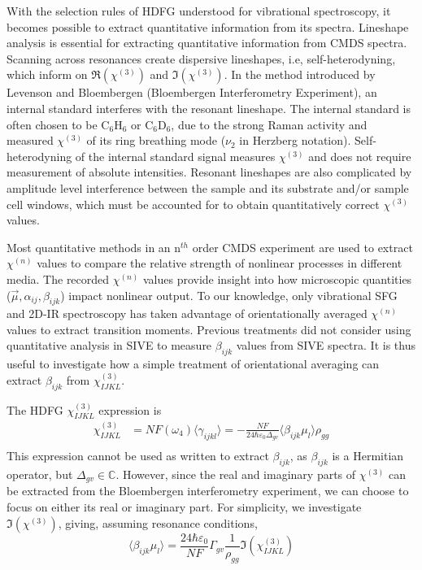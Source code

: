 \documentclass[aip, jcp, reprint, onecolumn]{revtex4-2}
\begin{document}
With the selection rules of HDFG understood for vibrational spectroscopy, it becomes possible to extract quantitative information from its spectra.
Lineshape analysis is essential for extracting quantitative information from CMDS spectra.
Scanning across resonances create dispersive lineshapes, i.e, self-heterodyning, which inform on $\Re(\chi^{(3)})$ and $\Im(\chi^{(3)})$.\cite{Levenson1974_1, Levenson1974_2}
In the method introduced by Levenson and Bloembergen (Bloembergen Interferometry Experiment), an internal standard interferes with the resonant lineshape.
The internal standard is often chosen to be C$_6$H$_6$ or C$_6$D$_6$, due to the strong Raman activity and measured $\chi^{(3)}$ of its ring breathing mode ($\nu_2$ in Herzberg notation). \cite{Levenson1974_2, RN351, RN345}
Self-heterodyning of the internal standard signal measures $\chi^{(3)}$ and does not require measurement of absolute intensities. 
Resonant lineshapes are also complicated by amplitude level interference between the sample and its substrate and/or sample cell windows, which must be accounted for to obtain quantitatively correct $\chi^{(3)}$ values. \cite{RN362, RN418}

Most quantitative methods in an n$^{th}$ order CMDS experiment are used to extract $\chi^{(n)}$ values to compare the relative strength of nonlinear processes in different media. \cite{Zhu87, RN351, RN345}
The recorded $\chi^{(n)}$ values provide insight into how microscopic quantities ($\vec{\mu}, \alpha_{ij}, \beta_{ijk}$) impact nonlinear output.
To our knowledge, only vibrational SFG and 2D-IR spectroscopy has taken advantage of orientationally averaged $\chi^{(n)}$ values to extract transition moments. \cite{Shen90, Moilanen2009, RN245}
Previous treatments did not consider using quantitative analysis in SIVE to measure $\beta_{ijk}$ values from SIVE spectra.
It is thus useful to investigate how a simple treatment of orientational averaging can extract $\beta_{ijk}$ from $\chi^{(3)}_{IJKL}$.

The HDFG $\chi^{(3)}_{IJKL}$ expression is
\begin{equation}\label{chi3}
\begin{split}
		\chi^{(3)}_{IJKL} &= NF(\omega_4) \langle \gamma_{ijkl} \rangle = -\frac{NF}{24 \hbar \varepsilon_0 \Delta_{gv}} \langle \beta_{ijk} \mu_l \rangle \rho_{gg}\\
\end{split}
\end{equation}
This expression cannot be used as written to extract $\beta_{ijk}$, as $\beta_{ijk}$ is a Hermitian operator, but $\Delta_{gv} \in \mathbb{C}$. 
However, since the real and imaginary parts of $\chi^{(3)}$ can be extracted from the Bloembergen interferometry experiment, we can choose to focus on either its real or imaginary part.
For simplicity, we investigate $\Im(\chi^{(3)})$, giving, assuming resonance conditions, 
\begin{equation}
	\langle \beta_{ijk} \mu_{l} \rangle = \frac{24 \hbar \varepsilon_0}{NF} \Gamma_{gv} \frac{1}{\rho_{gg}} \Im(\chi^{(3)}_{IJKL})
\end{equation}
\end{document}
